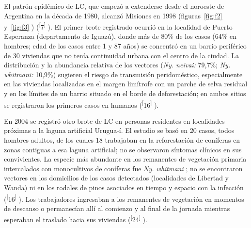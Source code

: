 \documentclass{article}
\begin{document}
El patrón epidémico de LC, que empezó a extenderse desde el noroeste de
Argentina en la década de 1980, alcanzó Misiones en 1998 (figuras~\ref{fig:f2}
y~\ref{fig:f3}
) (\textsuperscript{[}7\textsuperscript{]}
). El primer brote registrado ocurrió en la localidad de Puerto Esperanza
(departamento de Iguazú), donde más de 80\% de los casos (64\% en hombres; edad
de los casos entre 1 y 87 años) se concentró en un barrio periférico de 30
viviendas que no tenía continuidad urbana con el centro de la ciudad. La
distribución y la abundancia relativa de los vectores (\textit{Ny. neivai:}
79,7\%; \textit{Ny. whitmani:}
10,9\%) sugieren el riesgo de transmisión peridoméstico, especialmente en las
viviendas localizadas en el margen limítrofe con un parche de selva residual y
en los límites de un barrio situado en el borde de deforestación; en ambos
sitios se registraron los primeros casos en humanos
(\textsuperscript{[}16\textsuperscript{]}
).

En 2004 se registró otro brote de LC en personas residentes en localidades
próximas a la laguna artificial Urugua-í. El estudio se basó en 20 casos, todos
hombres adultos, de los cuales 18 trabajaban en la reforestación de coníferas en
zonas contiguas a esa laguna artificial; no se observaron síntomas clínicos en
sus convivientes. La especie más abundante en los remanentes de vegetación
primaria intercalados con monocultivos de coníferas fue \textit{Ny. whitmani}
; no se encontraron vectores en los domicilios de los casos detectados
(localidades de Libertad y Wanda) ni en los rodales de pinos asociados en tiempo
y espacio con la infección (\textsuperscript{[}16\textsuperscript{]}
). Los trabajadores ingresaban a los remanentes de vegetación en momentos de
descanso o permanecían allí al comienzo y al final de la jornada mientras
esperaban el traslado hacia sus viviendas
(\textsuperscript{[}24\textsuperscript{]}
).
\end{document}
